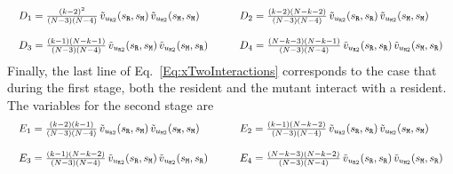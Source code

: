 \documentclass[11pt]{article}
\def\resident{\texttt{R}}
\def\mutant{\texttt{M}}
\def\strategy{s}
\theoremstyle{plainCl1}
\theoremstyle{plainCl2}
\begin{document}
\begin{equation*}
  \setlength{\arraycolsep}{10pt}
  \begin{array}{llrl}
   D_1  = \frac{\left(k - 2\right)^{2}}{(N - 3) (N - 4)} \, \tilde{v}_{u_{\resident 2}}(\strategy_\resident,\strategy_\mutant)\, \tilde{v}_{u_{\mutant 2}}(\strategy_\mutant,\strategy_\mutant) \quad
   &D_2 = \frac{\left(k - 2\right) \left(N - k - 2\right)}{(N - 3) (N - 4)}\,  \tilde{v}_{u_{\resident 2}}(\strategy_\resident,\strategy_\resident)\, \tilde{v}_{u_{\mutant 2}}(\strategy_\mutant,\strategy_\mutant) \\[0.5cm] 
   D_3  = \frac{\left(k - 1\right) \left(N - k - 1\right)}{(N - 3) (N - 4)} \, \tilde{v}_{u_{\resident 2}}(\strategy_\resident,\strategy_\mutant) \,\tilde{v}_{u_{\mutant 2}}(\strategy_\mutant,\strategy_\resident) \quad
   &D_4 = \frac{\left(N - k - 3\right) \left(N - k - 1\right)}{(N - 3) (N - 4)} \, \tilde{v}_{u_{\resident 2}}(\strategy_\resident,\strategy_\resident) \,\tilde{v}_{u_{\mutant 2}}(\strategy_\mutant,\strategy_\resident) 
      \end{array}
   \end{equation*}
Finally, the last line of Eq.~\eqref{Eq:xTwoInteractions} corresponds to the case that during the first stage, both the resident and the mutant interact with a resident. The variables for the second stage are
\begin{equation*}
  \setlength{\arraycolsep}{10pt}
    \begin{array}{llrl}
   E_1  = \frac{(k - 2)(k - 1)}{(N-3)(N-4)}\, \tilde{v}_{u_{\resident 2}}(\strategy_\resident,\strategy_\mutant)\, \tilde{v}_{u_{\mutant 2}}(\strategy_\mutant,\strategy_\mutant) \quad
   &E_2 = \frac{\left(k - 1\right) \left(N - k - 2\right)}{(N - 3) (N - 4)}\, \tilde{v}_{u_{\resident 2}}(\strategy_\resident,\strategy_\resident)\, \tilde{v}_{u_{\mutant 2}}(\strategy_\mutant,\strategy_\mutant) \\[0.5cm] 
   E_3  = \frac{\left(k - 1\right) \left(N - k - 2\right)}{(N - 3) (N - 4)}\, \tilde{v}_{u_{\resident 2}}(\strategy_\resident,\strategy_\mutant)\, \tilde{v}_{u_{\mutant 2}}(\strategy_\mutant,\strategy_\resident) \quad
   &E_4 = \frac{\left(N - k - 3\right) \left(N - k - 2\right)}{(N - 3) (N - 4)} \,\tilde{v}_{u_{\resident 2}}(\strategy_\resident,\strategy_\resident)\, \tilde{v}_{u_{\mutant 2}}(\strategy_\mutant,\strategy_\resident)
  \end{array}
\end{equation*}

\end{document}
